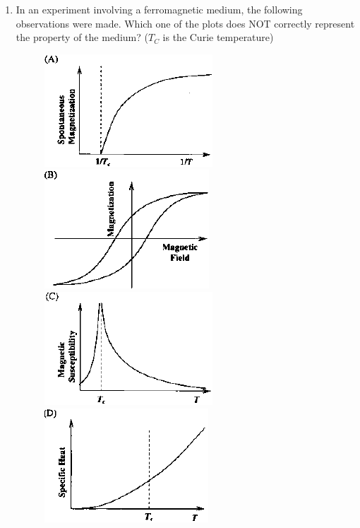\documentclass[journal,12pt,onecolumn]{IEEEtran}
\theoremstyle{remark}
\begin{document}
\begin{enumerate}
\item In an experiment involving a ferromagnetic medium, the following observations were made. Which one of the plots does NOT correctly represent the property of the medium? ($T_C$ is the Curie temperature)\hfill{}
\begin{figure}[H]
\begin{multicols}{2}
	\centering
	\caption*{} \label{fig:9a} \includegraphics[width=0.45\columnwidth]{figs/9a.png}
	\caption*{} \label{fig:9b} \includegraphics[width=0.45\columnwidth]{figs/9b.png}
	\caption*{} \label{fig:9c} \includegraphics[width=0.45\columnwidth]{figs/9c.png}
	\caption*{} \label{fig:9d} \includegraphics[width=0.45\columnwidth]{figs/9d.png}
	\end{multicols}
\end{figure}


\end{enumerate}
\end{document}
